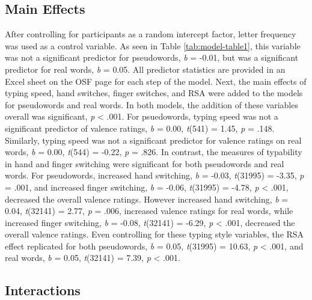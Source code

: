 \documentclass[english,man]{apa6}
\theoremstyle{definition}
\theoremstyle{definition}
\theoremstyle{definition}
\theoremstyle{remark}
\begin{document}
\subsection{Main Effects}\label{main-effects}

After controlling for participants as a random intercept factor, letter
frequency was used as a control variable. As seen in Table
\ref{tab:model-table1}, this variable was not a significant predictor
for pseudowords, \emph{b} = -0.01, but was a significant predictor for
real words, \emph{b} = 0.05. All predictor statistics are provided in an
Excel sheet on the OSF page for each step of the model. Next, the main
effects of typing speed, hand switches, finger switches, and RSA were
added to the models for pseudowords and real words. In both models, the
addition of these variables overall was significant, \emph{p}
\textless{} .001. For psuedowords, typing speed was not a significant
predictor of valence ratings, \emph{b} = 0.00, \emph{t}(541) = 1.45,
\emph{p} = .148. Similarly, typing speed was not a significant predictor
for valence ratings on real words, \emph{b} = 0.00, \emph{t}(544) =
-0.22, \emph{p} = .826. In contrast, the measures of typability in hand
and finger switching were significant for both pseudowords and real
words. For pseudowords, increased hand switching, \emph{b} = -0.03,
\emph{t}(31995) = -3.35, \emph{p} = .001, and increased finger
switching, \emph{b} = -0.06, \emph{t}(31995) = -4.78, \emph{p}
\textless{} .001, decreased the overall valence ratings. However
increased hand switching, \emph{b} = 0.04, \emph{t}(32141) = 2.77,
\emph{p} = .006, increased valence ratings for real words, while
increased finger switching, \emph{b} = -0.08, \emph{t}(32141) = -6.29,
\emph{p} \textless{} .001, decreased the overall valence ratings. Even
controlling for these typing style variables, the RSA effect replicated
for both pseudowords, \emph{b} = 0.05, \emph{t}(31995) = 10.63, \emph{p}
\textless{} .001, and real words, \emph{b} = 0.05, \emph{t}(32141) =
7.39, \emph{p} \textless{} .001.

\subsection{Interactions}\label{interactions}
\end{document}

